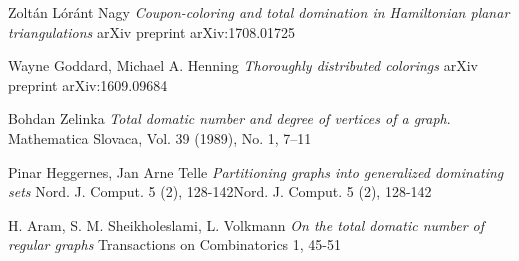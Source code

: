 \begin{thebibliography}{9}

Zoltán Lóránt Nagy
\textit{Coupon-coloring and total domination in Hamiltonian planar triangulations}
arXiv preprint arXiv:1708.01725

Wayne Goddard, Michael A. Henning
\textit{Thoroughly distributed colorings}
arXiv preprint arXiv:1609.09684

Bohdan Zelinka
\textit{Total domatic number and degree of vertices of a graph}.
Mathematica Slovaca, Vol. 39 (1989), No. 1, 7--11

Pinar Heggernes, Jan Arne Telle
\textit{Partitioning graphs into generalized dominating sets}
Nord. J. Comput. 5 (2), 128-142Nord. J. Comput. 5 (2), 128-142

H. Aram, S. M. Sheikholeslami, L. Volkmann
\textit{On the total domatic number of regular graphs}
Transactions on Combinatorics 1, 45-51

\end{thebibliography}
